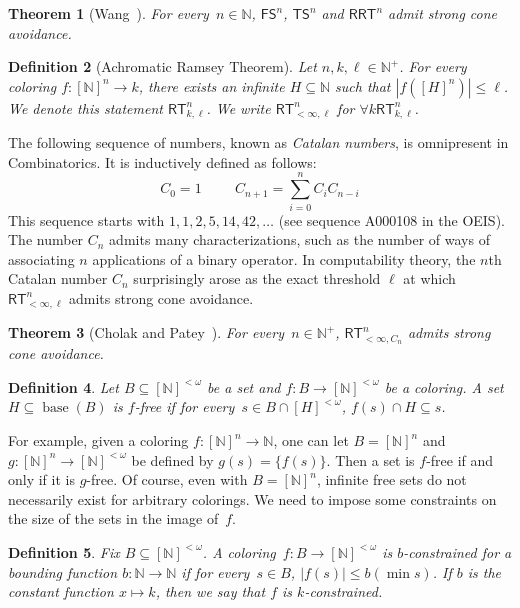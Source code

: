 \documentclass[10pt,a4paper]{article}
\newcommand{\RRT}[0]{\mathsf{RRT}}
\newcommand{\FS}[0]{\mathsf{FS}}
\newcommand{\TS}[0]{\mathsf{TS}}
\newcommand{\RT}[0]{\mathsf{RT}}
\newcommand{\NN}[0]{\mathbb{N}}
\newcommand{\base}{\operatorname{base}}
\newtheorem{theorem}{Theorem}
\numberwithin{theorem}{section}
\newtheorem{definition}[theorem]{Definition}
\begin{document}
\begin{theorem}[Wang~\cite{wang2014some}]
For every~$n \in \NN$, $\FS^n$, $\TS^n$ and $\RRT^n$ admit strong cone avoidance.
\end{theorem}

\begin{definition}[Achromatic Ramsey Theorem]
Let $n, k, \ell \in \NN^+$. For every coloring $f : [\NN]^n \to k$, there exists an infinite $H \subseteq \NN$
such that $|f([H]^n)| \leq \ell$. We denote this statement $\RT^n_{k, \ell}$. We write $\RT^n_{<\infty, \ell}$ for $\forall k \RT^n_{k, \ell}$.
\end{definition}

The following sequence of numbers, known as \emph{Catalan numbers}, is omnipresent in Combinatorics. It is inductively defined as follows:
$$
C_0 = 1 \hspace{1cm} C_{n+1} = \sum_{i = 0}^n C_i C_{n-i}
$$
This sequence starts with $1, 1, 2, 5, 14, 42, \dots$ (see sequence A000108 in the OEIS). The number $C_n$ admits many characterizations, such as the number of ways of associating $n$ applications of a binary operator. In computability theory, the $n$th Catalan number $C_n$ surprisingly arose as the exact threshold $\ell$ at which $\RT^n_{<\infty, \ell}$ admits strong cone avoidance.

\begin{theorem}[Cholak and Patey~\cite{cholak2020thin}]
For every~$n \in \NN^+$, $\RT^n_{<\infty, C_n}$ admits strong cone avoidance.
\end{theorem}

\begin{definition}
Let $B \subseteq [\NN]^{<\omega}$ be a set and $f : B \to [\NN]^{<\omega}$ be a coloring.
A set~$H \subseteq \base(B)$ is \emph{$f$-free} if for every~$s \in B \cap [H]^{<\omega}$, $f(s) \cap H \subseteq s$.
\end{definition}

For example, given a coloring $f : [\NN]^n \to \NN$, one can let $B = [\NN]^n$ and $g : [\NN]^n \to [\NN]^{<\omega}$ be defined by $g(s) = \{f(s)\}$. Then a set is $f$-free if and only if it is $g$-free.
Of course, even with $B = [\NN]^n$, infinite free sets do not necessarily exist for arbitrary colorings. We need to impose some constraints on the size of the sets in the image of~$f$.

\begin{definition}
Fix $B \subseteq [\NN]^{<\omega}$.
A coloring~$f : B \to [\NN]^{<\omega}$ is \emph{$b$-constrained} for a bounding function $b : \NN \to \NN$ if for every~$s \in B$, $|f(s)| \leq b(\min s)$. If $b$ is the constant function $x \mapsto k$, then we say that $f$ is \emph{$k$-constrained}.
\end{definition}
\end{document}
